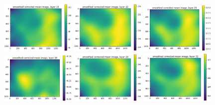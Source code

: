 \documentclass[letterpaper,11pt]{article}
\begin{document}
\begin{figure}[!ht]
\includegraphics[width=0.32\textwidth]{images/results/smoothed_corrected_mean_image_layers_vectra/smoothed_corrected_mean_image_layer_19}
\includegraphics[width=0.32\textwidth]{images/results/smoothed_corrected_mean_image_layers_vectra/smoothed_corrected_mean_image_layer_22}
\includegraphics[width=0.32\textwidth]{images/results/smoothed_corrected_mean_image_layers_vectra/smoothed_corrected_mean_image_layer_25}
\includegraphics[width=0.32\textwidth]{images/results/smoothed_corrected_mean_image_layers_vectra/smoothed_corrected_mean_image_layer_26}
\includegraphics[width=0.32\textwidth]{images/results/smoothed_corrected_mean_image_layers_vectra/smoothed_corrected_mean_image_layer_29}
\includegraphics[width=0.32\textwidth]{images/results/smoothed_corrected_mean_image_layers_vectra/smoothed_corrected_mean_image_layer_32}

\end{figure}
\end{document}
